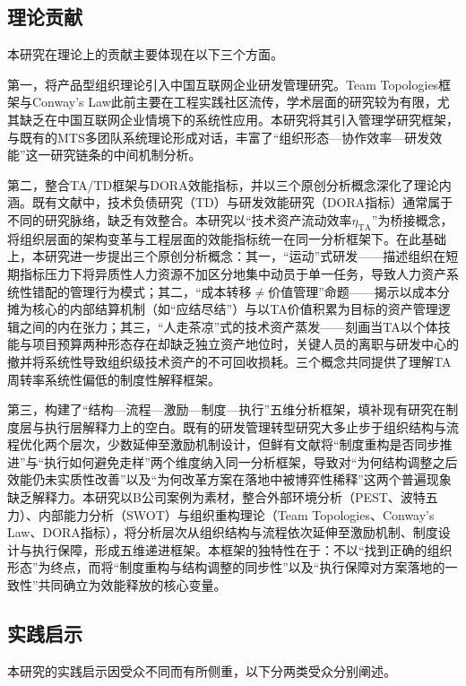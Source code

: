 \subsection{理论贡献}

本研究在理论上的贡献主要体现在以下三个方面。

第一，将产品型组织理论引入中国互联网企业研发管理研究。Team Topologies框架与Conway's Law此前主要在工程实践社区流传，学术层面的研究较为有限，尤其缺乏在中国互联网企业情境下的系统性应用。本研究将其引入管理学研究框架，与既有的MTS多团队系统理论\cite{mathieu2008team}形成对话，丰富了“组织形态—协作效率—研发效能”这一研究链条的中间机制分析。

第二，整合TA/TD框架与DORA效能指标，并以三个原创分析概念深化了理论内涵。既有文献中，技术负债研究（TD）与研发效能研究（DORA指标）通常属于不同的研究脉络，缺乏有效整合。本研究以“技术资产流动效率$\eta_{\mathrm{TA}}$”为桥接概念，将组织层面的架构变革与工程层面的效能指标统一在同一分析框架下。在此基础上，本研究进一步提出三个原创分析概念：其一，“运动”式研发——描述组织在短期指标压力下将异质性人力资源不加区分地集中动员于单一任务，导致人力资产系统性错配的管理行为模式；其二，“成本转移$\neq$价值管理”命题——揭示以成本分摊为核心的内部结算机制（如“应结尽结”）与以TA价值积累为目标的资产管理逻辑之间的内在张力；其三，“人走茶凉”式的技术资产蒸发——刻画当TA以个体技能与项目预算两种形态存在却缺乏独立资产地位时，关键人员的离职与研发中心的撤并将系统性导致组织级技术资产的不可回收损耗。三个概念共同提供了理解TA周转率系统性偏低的制度性解释框架。

第三，构建了“结构—流程—激励—制度—执行”五维分析框架，填补现有研究在制度层与执行层解释力上的空白。既有的研发管理转型研究大多止步于组织结构与流程优化两个层次，少数延伸至激励机制设计，但鲜有文献将“制度重构是否同步推进”与“执行如何避免走样”两个维度纳入同一分析框架，导致对“为何结构调整之后效能仍未实质性改善”以及“为何改革方案在落地中被博弈性稀释”这两个普遍现象缺乏解释力。本研究以B公司案例为素材，整合外部环境分析（PEST、波特五力）、内部能力分析（SWOT）与组织重构理论（Team Topologies、Conway's Law、DORA指标），将分析层次从组织结构与流程依次延伸至激励机制、制度设计与执行保障，形成五维递进框架。本框架的独特性在于：不以“找到正确的组织形态”为终点，而将“制度重构与结构调整的同步性”以及“执行保障对方案落地的一致性”共同确立为效能释放的核心变量\cite{porter1980competitive,damanpour2012managerial}。

\subsection{实践启示}

本研究的实践启示因受众不同而有所侧重，以下分两类受众分别阐述。

